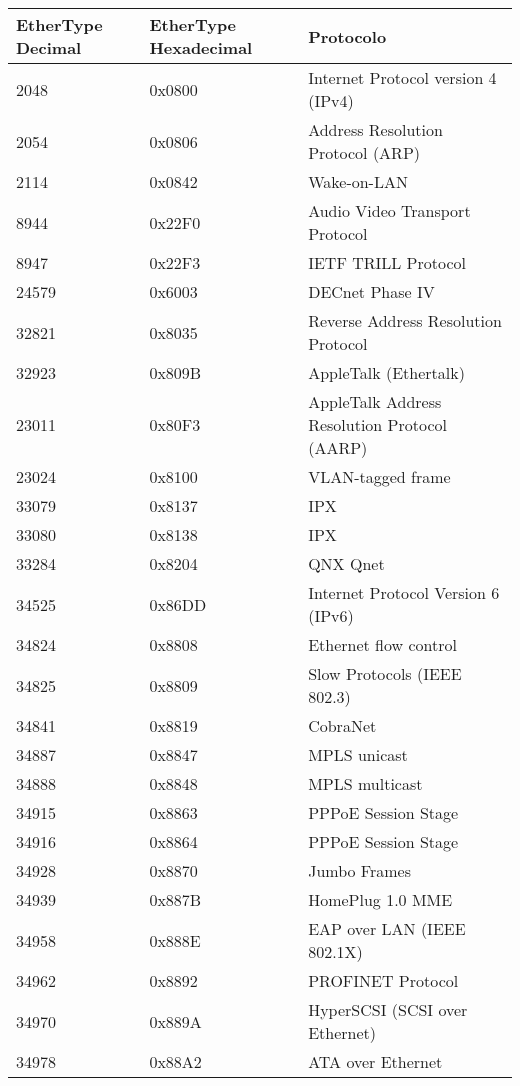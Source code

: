 \begin{table}[H]
\begin{tabular}{|l|l|l}
\hline
\textbf{EtherType Decimal} & \textbf{EtherType Hexadecimal} & \textbf{Protocolo} \\ \hline
2048 & 0x0800 & Internet Protocol version 4 (IPv4) \\ \hline
2054 & 0x0806 & Address Resolution Protocol (ARP) \\ \hline
2114 & 0x0842 & Wake-on-LAN  \\ \hline
8944 & 0x22F0 & Audio Video Transport Protocol\\ \hline
8947 & 0x22F3 & IETF TRILL Protocol \\ \hline
24579 & 0x6003 & DECnet Phase IV \\ \hline
32821 & 0x8035 & Reverse Address Resolution Protocol \\ \hline
32923 & 0x809B & AppleTalk (Ethertalk) \\ \hline
23011 & 0x80F3 & AppleTalk Address Resolution Protocol (AARP) \\ \hline
23024 & 0x8100 & VLAN-tagged frame \\ \hline
33079 & 0x8137 & IPX \\ \hline
33080 & 0x8138 & IPX \\ \hline
33284 & 0x8204 & QNX Qnet \\ \hline
34525 & 0x86DD & Internet Protocol Version 6 (IPv6) \\ \hline
34824 & 0x8808 & Ethernet flow control \\ \hline
34825 & 0x8809 & Slow Protocols (IEEE 802.3) \\ \hline
34841 & 0x8819 & CobraNet \\ \hline
34887 & 0x8847 & MPLS unicast \\ \hline
34888 & 0x8848 & MPLS multicast \\ \hline
34915 & 0x8863 & PPPoE Session Stage \\ \hline
34916 & 0x8864 & PPPoE Session Stage \\ \hline
34928 & 0x8870 & Jumbo Frames \\ \hline
34939 & 0x887B & HomePlug 1.0 MME \\ \hline
34958 & 0x888E & EAP over LAN (IEEE 802.1X) \\ \hline
34962 & 0x8892 & PROFINET Protocol \\ \hline
34970 & 0x889A & HyperSCSI (SCSI over Ethernet) \\ \hline
34978 & 0x88A2 & ATA over Ethernet \\ \hline

\end{tabular}
\end{table}
